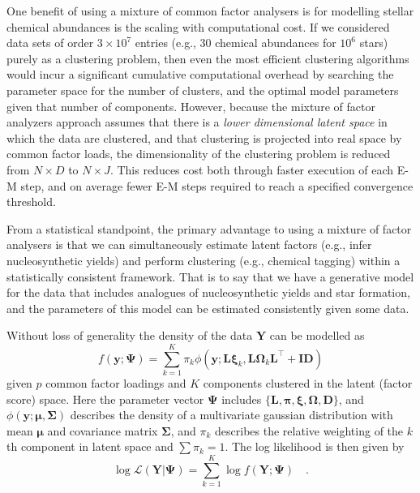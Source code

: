 \documentclass[twocolumn]{aastex61}
\newcommand{\vect}[1]{\boldsymbol{\mathbf{#1}}}
\renewcommand{\vec}[1]{\vect{#1}}
\newcommand{\weight}{\pi}
\newcommand{\data}{\textbf{Y}}
\newcommand{\vecdata}{\vec\data}
\newcommand{\transpose}{^\intercal}
\newcommand{\eye}{\textbf{I}}
\newcommand{\factorloads}{\textbf{L}}
\newcommand{\specificvariance}{\vec{D}}
\newcommand{\scoremeans}{\vec\xi}
\newcommand{\scorecovs}{\vec\Omega}
\begin{document}
One benefit of using a mixture of common factor analysers is
for modelling stellar chemical abundances is the scaling with
computational cost. If we considered data sets of order $3\times10^7$
entries (e.g., 30 chemical abundances for $10^6$ stars) purely as a
clustering problem, then even the most efficient clustering
algorithms would incur a significant cumulative computational 
overhead by searching the parameter space for the number of
clusters, and the optimal model parameters given that number
of components. However, because the mixture of factor analyzers
approach assumes that there is a \emph{lower dimensional latent 
space} in which the data are clustered, and that clustering is 
projected into real space by common factor loads, the 
dimensionality of the clustering problem is reduced from 
$N \times D$ to $N \times J$. This reduces cost both through
faster execution of each E-M step, and on average fewer E-M steps
required to reach a specified convergence threshold.

From a statistical standpoint, the primary advantage to using
a mixture of factor analysers is that we can simultaneously
estimate latent factors (e.g., infer nucleosynthetic 
yields) and perform clustering (e.g., chemical tagging) 
within a statistically consistent framework. That is to say
that we have a generative model for the data that includes
analogues of nucleosynthetic yields and star formation,
and the parameters of this model can be estimated consistently
given some data.

Without loss of generality the density of the data $\vecdata$ can be modelled as
\begin{equation}
	f(\textbf{y}; \vec\Psi) = \sum_{k=1}^{K}\weight_{k}\phi(\textbf{y};\factorloads\scoremeans_k, \factorloads\scorecovs_k\factorloads\transpose + \eye\specificvariance)
\end{equation}
\noindent{}given $p$ common factor loadings and $K$ components
clustered in the latent (factor score) space. Here the parameter
vector
$\vec\Psi$ includes $\{\factorloads,\vec\pi,\scoremeans,\scorecovs,\specificvariance\}$, and $\phi(\textbf{y};\vec\mu, \vec\Sigma)$
describes the density of a multivariate gaussian distribution with
mean $\vec\mu$ and covariance matrix $\vec\Sigma$,
and $\weight_k$ describes the relative weighting of the $k$th
component in latent space and $\sum\weight_k = 1$.
The log likelihood is then given by
\begin{equation}
	\log\mathcal{L}(\vecdata|\vec\Psi) = \sum_{k=1}^{K}\log{f(\vecdata;\vec\Psi)} \quad .
\end{equation}
\end{document}
